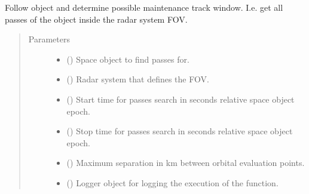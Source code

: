 \documentclass[letterpaper,10pt,english]{sphinxmanual}
\begin{document}

\begin{fulllineitems}
\label{\detokenize{modules/simulate_tracking:simulate_tracking.get_passes}}
Follow object and determine possible maintenance track window. I.e. get all passes of the object inside the radar system FOV.
\begin{quote}\begin{description}
\item[{Parameters}] \leavevmode\begin{itemize}
\item {} 
 ({\hyperref[\detokenize{modules/space_object:space_object.SpaceObject}]{}}) \textendash{} Space object to find passes for.

\item {} 
 ({\hyperref[\detokenize{modules/radar_config:radar_config.RadarSystem}]{}}) \textendash{} Radar system that defines the FOV.

\item {} 
 () \textendash{} Start time for passes search in seconds relative space object epoch.

\item {} 
 () \textendash{} Stop time for passes search in seconds relative space object epoch.

\item {} 
 () \textendash{} Maximum separation in km between orbital evaluation points.

\item {} 
 () \textendash{} Logger object for logging the execution of the function.


\end{itemize}
\end{description}
\end{quote}
\end{fulllineitems}
\end{document}
